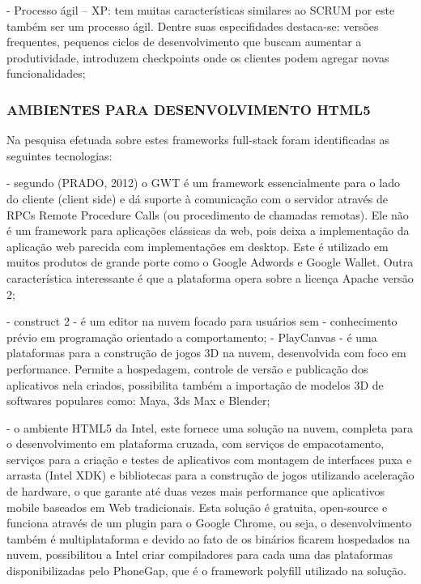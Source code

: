\documentclass[11pt,a4paper]{article}
\begin{document}
- Processo ágil – XP: tem muitas características similares ao SCRUM
por este também ser um processo ágil. Dentre suas especifidades
destaca-se: versões frequentes, pequenos ciclos de desenvolvimento que
buscam aumentar a produtividade, introduzem checkpoints onde os clientes
podem agregar novas funcionalidades;

\subsubsection{ AMBIENTES PARA DESENVOLVIMENTO HTML5}

Na pesquisa efetuada sobre estes frameworks full-stack foram
identificadas as seguintes tecnologias:

    - segundo (PRADO, 2012) o GWT é um framework essencialmente para
o lado do cliente (client side) e dá suporte à comunicação com
o servidor através de RPCs Remote Procedure Calls (ou procedimento
de chamadas remotas). Ele não é um framework para aplicações
clássicas da web, pois deixa a implementação da aplicação web
parecida com implementações em desktop. Este é utilizado em muitos
produtos de grande porte como o Google Adwords e Google Wallet. Outra
característica interessante é que a plataforma opera sobre a licença
Apache versão 2;

    - construct 2 - é um editor na nuvem focado para usuários sem
    - conhecimento prévio em programação orientado a comportamento;
    - PlayCanvas - é uma plataformas para a construção de jogos 3D
na nuvem, desenvolvida com foco em performance. Permite a hospedagem,
controle de versão e publicação dos aplicativos nela criados,
possibilita também a importação de modelos 3D de softwares populares
como: Maya, 3ds Max e Blender;

    - o ambiente HTML5 da Intel, este fornece uma solução na nuvem,
completa para o desenvolvimento em plataforma cruzada, com serviços de
empacotamento, serviços para a criação e testes de aplicativos com
montagem de interfaces puxa e arrasta (Intel XDK) e bibliotecas para a
construção de jogos utilizando aceleração de hardware, o que garante
até duas vezes mais performance que aplicativos mobile baseados em
Web tradicionais. Esta solução é gratuita, open-source e funciona
através de um plugin para o Google Chrome, ou seja, o desenvolvimento
também é multiplataforma e devido ao fato de os binários ficarem
hospedados na nuvem, possibilitou a Intel criar compiladores para cada
uma das plataformas disponibilizadas pelo PhoneGap, que é o framework
polyfill utilizado na solução.
\end{document}
